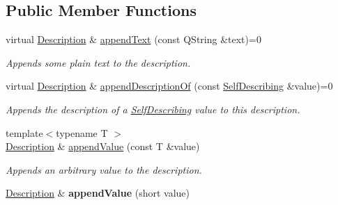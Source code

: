 \subsection*{Public Member Functions}
\begin{DoxyCompactItemize}
\item 
\hypertarget{class_hamcrest_qt_1_1_description_ab6160a4dab7192858975de1827db2a63}{virtual \hyperlink{class_hamcrest_qt_1_1_description}{Description} \& \hyperlink{class_hamcrest_qt_1_1_description_ab6160a4dab7192858975de1827db2a63}{append\-Text} (const Q\-String \&text)=0}\label{class_hamcrest_qt_1_1_description_ab6160a4dab7192858975de1827db2a63}

\begin{DoxyCompactList}\small\item\em Appends some plain text to the description. \end{DoxyCompactList}\item 
\hypertarget{class_hamcrest_qt_1_1_description_a973e1c3f7ad1f782540a19404cb52c66}{virtual \hyperlink{class_hamcrest_qt_1_1_description}{Description} \& \hyperlink{class_hamcrest_qt_1_1_description_a973e1c3f7ad1f782540a19404cb52c66}{append\-Description\-Of} (const \hyperlink{class_hamcrest_qt_1_1_self_describing}{Self\-Describing} \&value)=0}\label{class_hamcrest_qt_1_1_description_a973e1c3f7ad1f782540a19404cb52c66}

\begin{DoxyCompactList}\small\item\em Appends the description of a \hyperlink{class_hamcrest_qt_1_1_self_describing}{Self\-Describing} value to this description. \end{DoxyCompactList}\item 
\hypertarget{class_hamcrest_qt_1_1_description_a4418ed4f68a03cf1b63b5875bf7ea65c}{{\footnotesize template$<$typename T $>$ }\\\hyperlink{class_hamcrest_qt_1_1_description}{Description} \& \hyperlink{class_hamcrest_qt_1_1_description_a4418ed4f68a03cf1b63b5875bf7ea65c}{append\-Value} (const T \&value)}\label{class_hamcrest_qt_1_1_description_a4418ed4f68a03cf1b63b5875bf7ea65c}

\begin{DoxyCompactList}\small\item\em Appends an arbitrary value to the description. \end{DoxyCompactList}\item 
\hypertarget{class_hamcrest_qt_1_1_description_a667e8d992135e9e0e55e5d8967e6eb9e}{\hyperlink{class_hamcrest_qt_1_1_description}{Description} \& {\bfseries append\-Value} (short value)}\label{class_hamcrest_qt_1_1_description_a667e8d992135e9e0e55e5d8967e6eb9e}


\end{DoxyCompactItemize}
